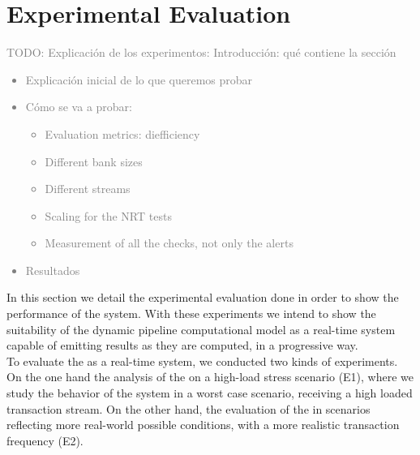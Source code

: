 \newpage
\section{Experimental Evaluation}

\textcolor{gray}{TODO: Explicación de los experimentos:
Introducción: qué contiene la sección
\begin{itemize}
    \item Explicación inicial de lo que queremos probar
    \item Cómo se va a probar:
    \begin{itemize}
        \item Evaluation metrics: diefficiency
        \item Different bank sizes
        \item Different streams
        \item Scaling for the NRT tests
        \item Measurement of all the checks, not only the alerts
    \end{itemize}
    \item Resultados
\end{itemize}
}

In this section we detail the experimental evaluation done in order to show the performance of the \DPATM system. With these experiments we intend to show the suitability of the dynamic pipeline computational model as a real-time system capable of emitting results as they are computed, in a progressive way.\\

To evaluate the \DPATM as a real-time system, we conducted two kinds of experiments. On the one hand the analysis of the \DPATM on a high-load stress scenario (E1), where we study the behavior of the system in a worst case scenario, receiving a high loaded transaction stream. On the other hand, the evaluation of the \DPATM in scenarios reflecting more real-world possible conditions, with a more realistic transaction frequency (E2).\\

